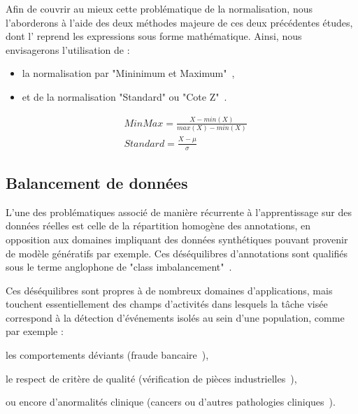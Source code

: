 Afin de couvrir au mieux cette problématique de la normalisation, nous l'aborderons à l'aide des deux méthodes majeure de ces deux précédentes études, dont l' reprend les expressions sous forme mathématique. Ainsi, nous envisagerons l'utilisation de :
\begin{itemize}
    \item la normalisation par "Mininimum et Maximum"~\cite{Juszczak2002},
    \item et de la normalisation "Standard" ou "Cote Z"~\cite{Celebi2007}.
\end{itemize}\par

\begin{equation} 
    \label{eq:scaling_methods}
    \begin{split}
    &MinMax=\frac{X-min(X)}{max(X)-min(X)}  \\
    &Standard=\frac{X-\mu{}}{\sigma}	    
    \end{split}
\end{equation}

\subsection{Balancement de données}
L'une des problématiques associé de manière récurrente à l'apprentissage sur des données réelles est celle de la répartition homogène des annotations, en opposition aux domaines impliquant des données synthétiques pouvant provenir de modèle génératifs par exemple. Ces déséquilibres d'annotations sont qualifiés sous le terme anglophone de "class imbalancement"~\cite{Prati2009, He2009}.\par

Ces déséquilibres sont propres à de nombreux domaines d'applications, mais touchent essentiellement des champs d'activités dans lesquels la tâche visée correspond à la détection d'événements isolés au sein d'une population, comme par exemple : 
\begin{inlinerate}
    \item les comportements déviants (fraude bancaire~\cite{Phua2004}),
    \item le respect de critère de qualité (vérification de pièces industrielles~\cite{Wu2018}),
    \item ou encore d'anormalités clinique (cancers ou d'autres pathologies cliniques~\cite{Celebi2007}).
\end{inlinerate}\par

